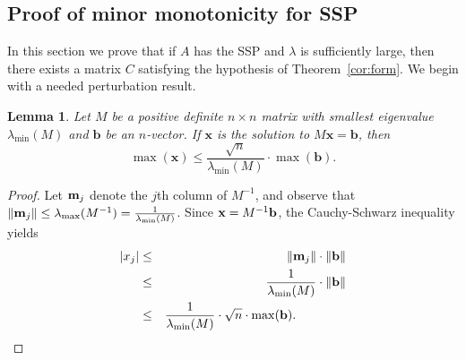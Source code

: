 \documentclass[11pt]{article}
\newtheorem{lem}[thm]{Lemma}
\theoremstyle{definition}
\theoremstyle{definition}
\theoremstyle{definition}
\newcommand{\bx}{{\bf x}}
\newcommand{\bb}{{\bf b}}
\newcommand{\bm}{{\bf m}}
\newcommand{\lam}{\lambda}
\def\trans{^{\top}}
\begin{document}
                         
                                      
\subsection{Proof of minor monotonicity for SSP}

In this section we prove that if $A$ has the SSP and $\lambda$ is sufficiently large, 
then there exists a matrix $C$ satisfying the hypothesis of Theorem~\ref{cor:form}.  We begin with a needed perturbation result.
\begin{lem}
\label{bound}
Let $M$ be a positive definite $n\times n$ matrix with smallest eigenvalue  $\lambda_{\min}(M)$ and $\mathbf{b}$ be an $n$-vector.
If $\mathbf{x}$ is the solution to $M\mathbf{x}=\mathbf{b}$, then 
\[\max(\mathbf{x}) \leq \frac{\sqrt{n}}{\lambda_{\min}(M) }\cdot \max (\mathbf{b}). \]
\end{lem}



\begin{proof}
Let $\bm_j$ denote the $j$th column of $M^{-1}$, and observe that $\|\bm_j\| \le \lam_{\max}(M^{-1})=\frac{1}{\lambda_{\min}(M)}$.  Since $\bx=M^{-1}\bb$,   the Cauchy-Schwarz inequality yields
\begin{eqnarray*}
|x_j|& \le & 
\| \bm_j \| \cdot \|   \bb \|\\
& \leq  &\frac{1}{\lambda_{\min}(M)} \cdot \| \mathbf{b}\| \\ 
& \leq  &\frac{1}{ \lambda_{\min}(M)} \cdot   \sqrt{n} \cdot \max(\mathbf{b}). \qquad\qquad\qedhere
\end{eqnarray*}
\end{proof}


\end{document}
